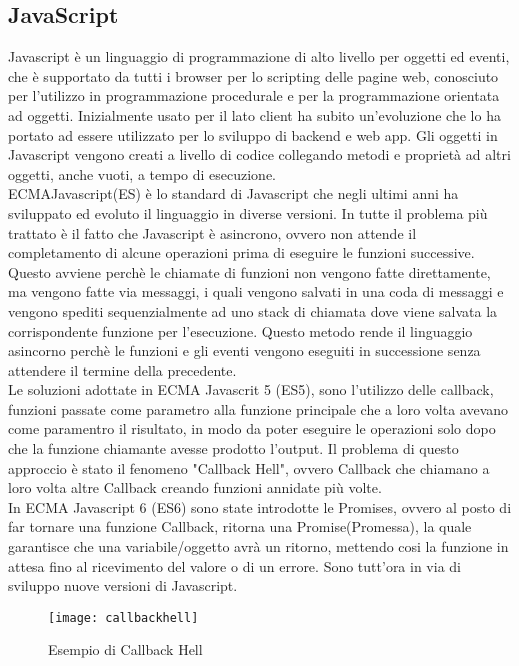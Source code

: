 \subsection{JavaScript}
Javascript \`e un linguaggio di programmazione di alto livello per oggetti ed eventi, che \`e supportato da tutti i browser
per lo scripting delle pagine web, conosciuto per l'utilizzo in programmazione procedurale e per la programmazione orientata ad oggetti.
Inizialmente usato per il lato client ha subito un'evoluzione che lo ha portato ad essere utilizzato per lo sviluppo di backend e web app.
Gli oggetti in Javascript vengono creati a livello di codice collegando metodi e propriet\`a ad altri oggetti, anche vuoti, a tempo
di esecuzione.
\\[2\baselineskip]
ECMAJavascript(ES) \`e lo standard di Javascript che negli ultimi anni ha sviluppato ed evoluto il linguaggio in diverse versioni.
In tutte il problema pi\`u trattato \`e il fatto che Javascript \`e asincrono, ovvero non attende il completamento di alcune
operazioni prima di eseguire le funzioni successive. Questo avviene perch\`e le chiamate di funzioni non vengono fatte direttamente, ma vengono
fatte via messaggi, i quali vengono salvati in una coda di messaggi e vengono spediti sequenzialmente ad uno stack di chiamata dove
viene salvata la corrispondente funzione per l'esecuzione. Questo metodo rende il linguaggio asincorno perch\`e le funzioni e gli eventi
vengono eseguiti in successione senza attendere il termine della precedente.
\\[1\baselineskip]Le soluzioni adottate in ECMA Javascrit 5 (ES5), sono l'utilizzo delle callback,
funzioni passate come parametro alla funzione principale che a loro volta avevano come paramentro il risultato, in modo da poter eseguire le operazioni
solo dopo che la funzione chiamante avesse prodotto l'output. Il problema di questo approccio \`e stato il fenomeno "Callback Hell", ovvero Callback che chiamano a loro volta
altre Callback creando funzioni annidate pi\`u volte.
\\[1\baselineskip]
In ECMA Javascript 6 (ES6) sono state introdotte le Promises, ovvero al posto di far tornare una funzione Callback, ritorna una Promise(Promessa),
la quale garantisce che una variabile/oggetto avr\`a un ritorno, mettendo cosi la funzione in attesa fino al ricevimento del valore o di un errore.
Sono tutt'ora in via di sviluppo nuove versioni di Javascript.
\\[2\baselineskip]
\begin{figure}[h]
    \texttt{[image: callbackhell]}
    \caption{Esempio di Callback Hell}
\end{figure}

